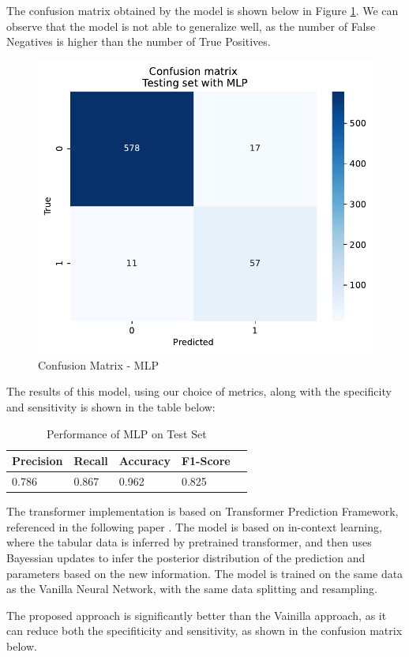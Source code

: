\documentclass[10pt,letterpaper]{article}
\begin{document}
The confusion matrix obtained by the model is shown below in Figure \ref{fig:cm-nn}. 
We can observe that the model is not able to generalize well, as the number of False Negatives is
higher than the number of True Positives.

\begin{figure}[H]
    \centering
    \includegraphics[width=0.5\linewidth]{plots/nn_confusion_matrix.pdf}
    \caption{Confusion Matrix - MLP}
    \label{fig:cm-nn}
\end{figure}

The results of this model, using our choice of metrics, along with the specificity and sensitivity is shown in the table below:

\begin{table}[H]
\centering
\footnotesize
\begin{tabular}{lllll}
\toprule
\textbf{Precision} & \textbf{Recall} & \textbf{Accuracy} &  \textbf{F1-Score}\\
\midrule
0.786 & 0.867 & 0.962 & 0.825  \\
\bottomrule
\end{tabular}
\caption{Performance of MLP on Test Set}%
\end{table}

The transformer implementation is based on Transformer Prediction Framework, referenced in the following paper \cite{hollmann2022tabpfn}. 
The model is based on in-context learning, where the tabular data is inferred by pretrained transformer, 
and then uses Bayessian updates to infer the posterior distribution of the prediction and parameters based on the 
new information. The model is trained on the same data as the Vanilla Neural Network, with the same data splitting and resampling.

The proposed approach is significantly better than the Vainilla approach, as it can reduce both 
the specifiticity and sensitivity, as shown in the confusion matrix below.
\end{document}
